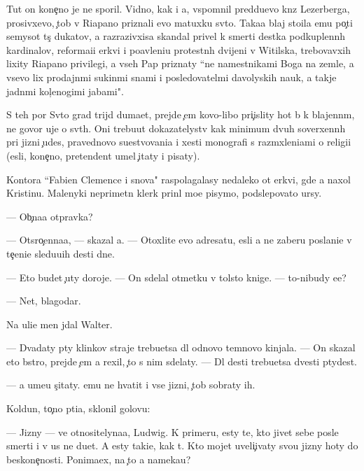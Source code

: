 \documentclass[10pt]{book}
\begin{document}
Tut on kone{\c}no je ne sporil. Vidno, kak i {\y}a, vspomnil pred{\yi}du{\x}evo kn{\ia}z{\ia} Lezerberga, prosivxevo, {\c}tob{\yi} v Riapano priznali {\y}evo matuxku sv{\ia}to{\y}. Taka{\y}a blaj sto{\y}ila {\y}emu po{\c}ti semysot t{\yi}s{\ia}{\c} dukatov, a razrazivxi{\y}sa skandal privel k smerti des{\ia}tka podkuplenn{\yi}h kardinalov, reforma{\q}i{\y}i {\Q}erkvi i po{\y}avleni{\y}u protestn{\yi}h dvijeni{\y} v Witilska, trebovavxih lixity Riapano privilegi{\y}, a vseh Pap priznaty ``ne namestnikami Boga na zemle, a vsevo lix prodajn{\yi}mi sukin{\yi}mi s{\yi}nami i posledovatel{\ia}mi d{\y}avolyskih nauk, a takje jadn{\yi}mi kol{\c}enogimi jabami".

S teh por Sv{\ia}to{\y} grad trijd{\yi} duma{\y}et, prejde {\c}em kovo-libo pri{\c}islity hot{\ia} b{\yi} k blajenn{\yi}m, ne govor{\ia} uje o sv{\ia}t{\yi}h. Oni trebu{\y}ut dokazatelystv kak minimum dvuh soverxenn{\yi}h pri jizni {\c}udes, pravednovo su{\x}estvovani{\y}a i xesti monografi{\y} s razm{\yi}xleni{\y}ami o religi{\y}i ({\y}esli, kone{\c}no, pretendent umel {\c}itaty i pisaty).

Kontora ``Fabien Clemence i s{\yi}nov{\y}a" raspolagalasy nedaleko ot {\q}erkvi, gde {\y}a naxol Kristinu. Malenyki{\y} neprimetn{\yi}{\y} klerk prin{\ia}l mo{\y}e pisymo, podslepovato {\x}ur{\ia}sy.

— Ob{\yi}{\c}na{\y}a otpravka?

— Otsro{\c}enna{\y}a, — skazal {\y}a. — Otoxlite {\y}evo adresatu, {\y}esli {\y}a ne zaberu poslani{\y}e v te{\c}eni{\y}e sledu{\y}u{\x}ih des{\ia}ti dne{\y}.

— Eto budet {\c}uty doroje. — On sdelal otmetku v tolsto{\y} knige. — {\C}to-nibudy {\y}e{\x}e?

— Net, blagodar{\iu}.

Na uli{\q}e men{\ia} jdal Walter.

— Dvad{\q}aty p{\ia}ty klinkov straje{\y} trebu{\y}etsa dl{\ia} odnovo temnovo kinjala. — On skazal eto b{\yi}stro, prejde {\c}em {\y}a rexil, {\c}to s nim sdelaty. — Dl{\ia} des{\ia}ti trebu{\y}etsa dvesti p{\ia}tydes{\ia}t.

— {\Y}a ume{\y}u s{\c}itaty. {\Y}emu ne hvatit i vse{\y} jizni, {\c}tob{\yi} sobraty ih.

Koldun, to{\c}no pti{\q}a, sklonil golovu:

— Jizny — ve{\x} otnositelyna{\y}a, Ludwig. K primeru, {\y}esty te, kto jivet sebe posle smerti i v us ne du{\y}et. A {\y}esty taki{\y}e, kak t{\yi}. Kto mojet uveli{\c}ivaty svo{\y}u jizny hoty do beskone{\c}nosti. Ponima{\y}ex, na {\c}to {\y}a nameka{\y}u?
\end{document}
